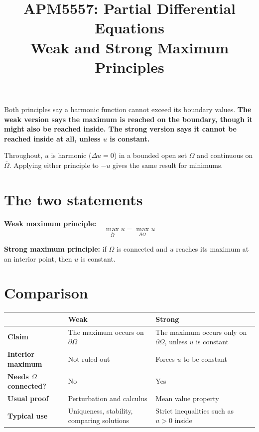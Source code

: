 \documentclass[11pt]{article}
\title{APM5557: Partial Differential Equations\\Weak and Strong Maximum Principles}
\author{}
\date{}
\newcommand{\lap}{\Delta}
\begin{document}
\maketitle

Both principles say a harmonic function cannot exceed its boundary values.
\textbf{The weak version says the maximum is reached on the boundary, though it
might also be reached inside. The strong version says it cannot be reached
inside at all, unless $u$ is constant.}

Throughout, $u$ is harmonic ($\lap u = 0$) in a bounded open set $\Omega$ and
continuous on $\overline{\Omega}$. Applying either principle to $-u$ gives the
same result for minimums.

\section*{The two statements}

\textbf{Weak maximum principle:}
\[
\max_{\overline{\Omega}} u = \max_{\partial\Omega} u
\]

\textbf{Strong maximum principle:} if $\Omega$ is connected and $u$ reaches its
maximum at an interior point, then $u$ is constant.

\section*{Comparison}

\begin{center}
\renewcommand{\arraystretch}{1.4}
\begin{tabular}{|>{\raggedright\arraybackslash}p{}
                |>{\raggedright\arraybackslash}p{}
                |>{\raggedright\arraybackslash}p{}|}
\hline
 & \textbf{Weak} & \textbf{Strong} \\
\hline
\textbf{Claim} & The maximum occurs on $\partial\Omega$
  & The maximum occurs only on $\partial\Omega$, unless $u$ is constant \\
\hline
\textbf{Interior maximum} & Not ruled out & Forces $u$ to be constant \\
\hline
\textbf{Needs $\Omega$ connected?} & No & Yes \\
\hline
\textbf{Usual proof} & Perturbation and calculus & Mean value property \\
\hline
\textbf{Typical use} & Uniqueness, stability, comparing solutions
  & Strict inequalities such as $u > 0$ inside \\
\hline
\end{tabular}
\end{center}
\end{document}
